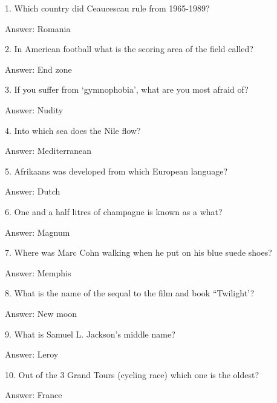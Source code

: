 \documentclass{beamer}
\begin{document}
    \begin{frame}
        1. Which country did Ceaucescau rule from 1965-1989?

        Answer: Romania
    \end{frame}

    \begin{frame}
        2. In American football what is the scoring area of the field called?

        Answer: End zone
    \end{frame}

    \begin{frame}
        3. If you suffer from `gymnophobia', what are you most afraid of?

        Answer: Nudity
    \end{frame}

    \begin{frame}
        4. Into which sea does the Nile flow?

        Answer: Mediterranean
    \end{frame}

    \begin{frame}
        5. Afrikaans was developed from which European language?

        Answer: Dutch
    \end{frame}

    \begin{frame}
        6. One and a half litres of champagne is known as a what?

        Answer: Magnum
    \end{frame}

    \begin{frame}
        7. Where was Marc Cohn walking when he put on his blue suede shoes?

        Answer: Memphis
    \end{frame}

    \begin{frame}
        8. What is the name of the sequal to the film and book ``Twilight'?

        Answer: New moon
    \end{frame}

    \begin{frame}
        9. What is Samuel L. Jackson’s middle name?

        Answer: Leroy
    \end{frame}

    \begin{frame}
        10. Out of the 3 Grand Tours (cycling race) which one is the oldest?

        Answer: France
    \end{frame}
\end{document}
